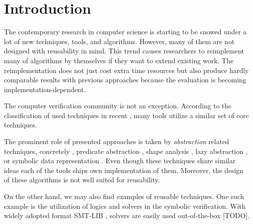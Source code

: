 \chapter{Introduction}
\label{ch:intro}


The contemporary research in computer science is starting to be snowed under a lot of new techniques, tools, and algorithms.
However, many of them are not designed with reusability in mind.
This trend causes researchers to reimplement many of algorithms by themselves if they want to extend existing work.
The reimplementation does not just cost extra time resources but also produce hardly comparable results with previous approaches because the evaluation is becoming implementation-dependent.

The computer verification community is not an exception.
According to the classification of used techniques in recent \svcomp \cite{SVCOMP2019}, many tools utilize a similar set of core techniques.

The prominent role of presented approaches is taken by \emph{abstraction} related techniques, concretely \cegar
\cite{Clarke20}, predicate abstraction \cite{Flanagan02}, shape analysis \cite{Yang2008}, lazy abstraction \cite{Henzinger2002}, or symbolic data representation \cite{King76,Burch1990,Majumdar2018}.
Even though these techniques share similar ideas each of the tools ships own implementation of them.
Moreover, the design of these algorithms is not well suited for reusability.


On the other hand, we may also find examples of reusable techniques.
One such example is the utilization of \smt logics and solvers in the symbolic verification.
With widely adopted format SMT-LIB \cite{Barrett2010}, \smt solvers are easily used out-of-the-box [TODO].


